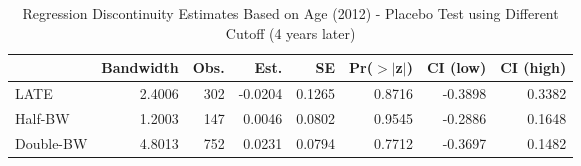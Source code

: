 \begin{table}[ht]
\centering
\begin{tabular}{lrrrrrrr}
  \hline
 & Bandwidth & Obs. & Est. & SE & Pr($>$$|$z$|$) & CI (low) & CI (high) \\ 
  \hline
LATE & 2.4006 & 302 & -0.0204 & 0.1265 & 0.8716 & -0.3898 & 0.3382 \\ 
  Half-BW & 1.2003 & 147 & 0.0046 & 0.0802 & 0.9545 & -0.2886 & 0.1648 \\ 
  Double-BW & 4.8013 & 752 & 0.0231 & 0.0794 & 0.7712 & -0.3697 & 0.1482 \\ 
   \hline
\end{tabular}
\caption{Regression Discontinuity Estimates Based on Age (2012) - Placebo Test using Different Cutoff (4 years later)} 
\label{tab:rd2012y_plac}
\end{table}

